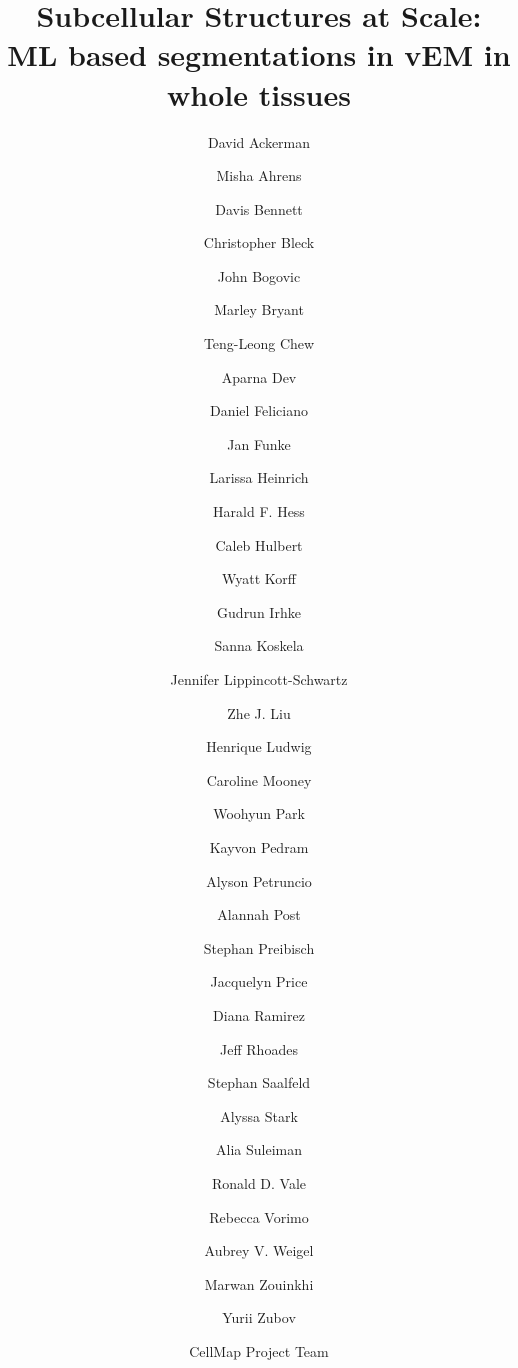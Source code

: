 \documentclass[times, twoside]{zHenriquesLab-StyleBioRxiv}
\begin{document}
\title{Subcellular Structures at Scale: ML based segmentations in vEM in whole tissues}


\author[1]{David Ackerman}
\author[1]{Misha Ahrens}
\author[1]{Davis Bennett}
\author[1]{Christopher Bleck}
\author[1]{John Bogovic}
\author[1]{Marley Bryant}
\author[1]{Teng-Leong Chew}
\author[1]{Aparna Dev}
\author[1]{Daniel Feliciano}
\author[1]{Jan Funke}
\author[1]{Larissa Heinrich}
\author[1]{Harald F. Hess}
\author[1]{Caleb Hulbert}
\author[1]{Wyatt Korff}
\author[1]{Gudrun Irhke}
\author[1]{Sanna Koskela}
\author[1]{Jennifer Lippincott-Schwartz}
\author[1]{Zhe J. Liu}
\author[1]{Henrique Ludwig}
\author[1]{Caroline Mooney}
\author[1]{Woohyun Park}
\author[1]{Kayvon Pedram}
\author[1]{Alyson Petruncio}
\author[1]{Alannah Post}
\author[1]{Stephan Preibisch}
\author[1]{Jacquelyn Price}
\author[1]{Diana Ramirez}
\author[1]{Jeff Rhoades}
\author[1]{Stephan Saalfeld}
\author[1]{Alyssa Stark}
\author[1]{Alia Suleiman}
\author[1]{Ronald D. Vale}
\author[1]{Rebecca Vorimo}
\author[1]{Aubrey V. Weigel}
\author[1]{Marwan Zouinkhi}
\author[1]{Yurii Zubov}
\author[1,\href{mailto:cellmapadmin@janelia.hhmi.org}{\Letter}]{CellMap Project Team}


\maketitle
\end{document}
